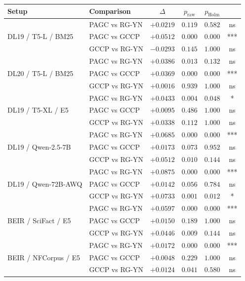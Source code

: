 \documentclass[sigconf]{acmart}
\begin{document}
\begin{table}[t]
\centering
\small
\begin{tabular}{llcccc}
\toprule
\textbf{Setup} & \textbf{Comparison} & \textbf{$\Delta$} & \textbf{$p_{\text{raw}}$} & \textbf{$p_{\text{Holm}}$} & \\
\midrule
\multirow{3}{*}{DL19 / T5-L / BM25}
 & PAGC vs RG-YN & $+0.0219$ & $0.119$ & $0.582$ & ns \\
 & PAGC vs GCCP  & $+0.0512$ & $0.000$ & $0.000$ & *** \\
 & GCCP vs RG-YN & $-0.0293$ & $0.145$ & $1.000$ & ns \\
\midrule
\multirow{3}{*}{DL20 / T5-L / BM25}
 & PAGC vs RG-YN & $+0.0386$ & $0.013$ & $0.132$ & ns \\
 & PAGC vs GCCP  & $+0.0369$ & $0.000$ & $0.000$ & *** \\
 & GCCP vs RG-YN & $+0.0016$ & $0.939$ & $1.000$ & ns \\
\midrule
\multirow{3}{*}{DL19 / T5-XL / E5}
 & PAGC vs RG-YN & $+0.0433$ & $0.004$ & $0.048$ & * \\
 & PAGC vs GCCP  & $+0.0095$ & $0.486$ & $1.000$ & ns \\
 & GCCP vs RG-YN & $+0.0338$ & $0.112$ & $1.000$ & ns \\
\midrule
\multirow{3}{*}{DL19 / Qwen-2.5-7B}
 & PAGC vs RG-YN & $+0.0685$ & $0.000$ & $0.000$ & *** \\
 & PAGC vs GCCP  & $+0.0173$ & $0.073$ & $0.952$ & ns \\
 & GCCP vs RG-YN & $+0.0512$ & $0.010$ & $0.144$ & ns \\
\midrule
\multirow{3}{*}{DL19 / Qwen-72B-AWQ}
 & PAGC vs RG-YN & $+0.0875$ & $0.000$ & $0.000$ & *** \\
 & PAGC vs GCCP  & $+0.0142$ & $0.056$ & $0.784$ & ns \\
 & GCCP vs RG-YN & $+0.0733$ & $0.001$ & $0.012$ & * \\
\midrule
\multirow{3}{*}{BEIR / SciFact / E5}
 & PAGC vs RG-YN & $+0.0597$ & $0.000$ & $0.000$ & *** \\
 & PAGC vs GCCP  & $+0.0150$ & $0.189$ & $1.000$ & ns \\
 & GCCP vs RG-YN & $+0.0446$ & $0.009$ & $0.144$ & ns \\
\midrule
\multirow{3}{*}{BEIR / NFCorpus / E5}
 & PAGC vs RG-YN & $+0.0172$ & $0.000$ & $0.000$ & *** \\
 & PAGC vs GCCP  & $+0.0048$ & $0.229$ & $1.000$ & ns \\
 & GCCP vs RG-YN & $+0.0124$ & $0.041$ & $0.580$ & ns \\

\end{tabular}
\end{table}
\end{document}
